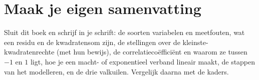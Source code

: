 
\ifzelfstudie
\section*{Maak je eigen samenvatting}
Sluit dit boek en schrijf in je schrift: de soorten variabelen en meetfouten, wat een residu en de kwadratensom zijn, de stellingen over de kleinste-kwadratenrechte (met hun bewijs), de correlatiecoëfficiënt en waarom ze tussen $-1$ en $1$ ligt, hoe je een macht- of exponentieel verband lineair maakt, de stappen van het modelleren, en de drie valkuilen. Vergelijk daarna met de kaders.
\fi
